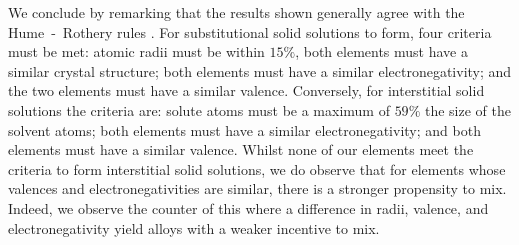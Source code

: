 We conclude by remarking that the results shown generally agree with the Hume~-~Rothery rules \cite{Hume_Rothery_Rule1,Hume_Rothery_Rule2,Hume_Rothery_Rule3,Hume_Rothery_Rule4}. For substitutional solid solutions to form, four criteria must be met: atomic radii must be within $15 \%$, both elements must have a similar crystal structure; both elements must have a similar electronegativity; and the two elements must have a similar valence. Conversely, for interstitial solid solutions the criteria are: solute atoms must be a maximum of $59 \%$ the size of the solvent atoms; both elements must have a similar electronegativity; and both elements must have a similar valence. Whilst none of our elements meet the criteria to form interstitial solid solutions, we do observe that for elements whose valences and electronegativities are similar, there is a stronger propensity to mix. Indeed, we observe the counter of this where a difference in radii, valence, and electronegativity yield alloys with a weaker incentive to mix.